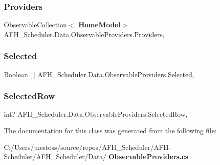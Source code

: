 \subsubsection{Providers}
{\footnotesize\ttfamily Observable\+Collection$<$\textbf{ Home\+Model}$>$ A\+F\+H\+\_\+\+Scheduler.\+Data.\+Observable\+Providers.\+Providers\hspace{0.3cm}{\ttfamily [get]}, {\ttfamily [set]}}

\mbox{\label{class_a_f_h___scheduler_1_1_data_1_1_observable_providers_a7a97ab7e3f0347ce51dc7ab18b70baab}} 
\subsubsection{Selected}
{\footnotesize\ttfamily Boolean [$\,$] A\+F\+H\+\_\+\+Scheduler.\+Data.\+Observable\+Providers.\+Selected\hspace{0.3cm}{\ttfamily [get]}, {\ttfamily [set]}}

\mbox{\label{class_a_f_h___scheduler_1_1_data_1_1_observable_providers_a16d00215a65e6072113779397e18f82e}} 
\subsubsection{SelectedRow}
{\footnotesize\ttfamily int? A\+F\+H\+\_\+\+Scheduler.\+Data.\+Observable\+Providers.\+Selected\+Row\hspace{0.3cm}{\ttfamily [get]}, {\ttfamily [set]}}



The documentation for this class was generated from the following file\+:\begin{DoxyCompactItemize}
\item 
C\+:/\+Users/jnestoss/source/repos/\+A\+F\+H\+\_\+\+Scheduler/\+A\+F\+H-\/\+Scheduler/\+A\+F\+H\+\_\+\+Scheduler/\+Data/\textbf{ Observable\+Providers.\+cs}\end{DoxyCompactItemize}
